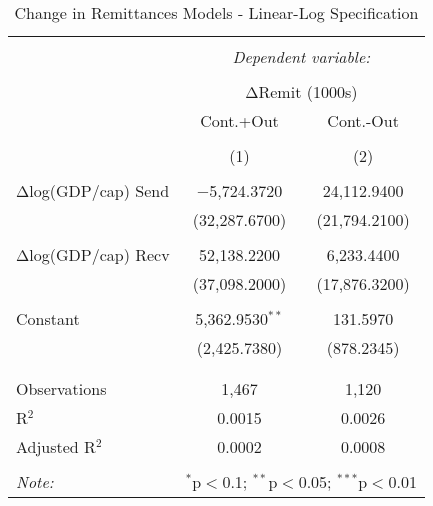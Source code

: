 
\begin{table}[!htbp] \centering 
  \caption{Change in Remittances Models - Linear-Log Specification} 
  \label{} 
\begin{tabular}{@{\extracolsep{5pt}}lcc} 
\\[-1.8ex]\hline 
\hline \\[-1.8ex] 
 & \multicolumn{2}{c}{\textit{Dependent variable:}} \\ 
\cline{2-3} 
\\[-1.8ex] & \multicolumn{2}{c}{ΔRemit (1000s)} \\ 
 & Cont.+Out & Cont.-Out \\ 
\\[-1.8ex] & (1) & (2)\\ 
\hline \\[-1.8ex] 
 Δlog(GDP/cap) Send & $-$5,724.3720 & 24,112.9400 \\ 
  & (32,287.6700) & (21,794.2100) \\ 
  & & \\ 
 Δlog(GDP/cap) Recv & 52,138.2200 & 6,233.4400 \\ 
  & (37,098.2000) & (17,876.3200) \\ 
  & & \\ 
 Constant & 5,362.9530$^{**}$ & 131.5970 \\ 
  & (2,425.7380) & (878.2345) \\ 
  & & \\ 
\hline \\[-1.8ex] 
Observations & 1,467 & 1,120 \\ 
R$^{2}$ & 0.0015 & 0.0026 \\ 
Adjusted R$^{2}$ & 0.0002 & 0.0008 \\ 
\hline 
\hline \\[-1.8ex] 
\textit{Note:}  & \multicolumn{2}{r}{$^{*}$p$<$0.1; $^{**}$p$<$0.05; $^{***}$p$<$0.01} \\ 
\end{tabular} 
\end{table} 
